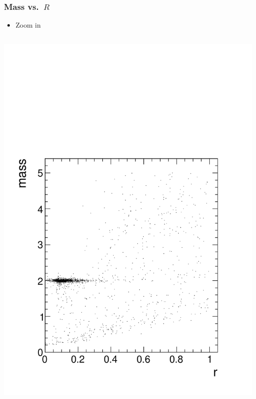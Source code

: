 \documentclass[compress]{beamer}
\begin{document}
\begin{frame}
\frametitle{Mass vs.\ $R$}

\begin{itemize}
\item Zoom in
\end{itemize}

\begin{columns}
\includegraphics[width=\linewidth]{mass_vs_r2.pdf}

\end{columns}
\end{frame}
\end{document}
